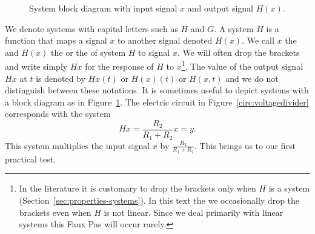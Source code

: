 \begin{figure}[tp]
\centering
{}
\caption{System block diagram with input signal $x$ and output signal $H(x)$.}\label{fig:blockdiagramH1}
\end{figure}



We denote systems with capital letters such as $H$ and $G$.  A system $H$ is a function that maps a signal $x$ to another signal denoted $H(x)$.  We call $x$ the  and $H(x)$ the  or the  of system $H$ to signal $x$.  We will often drop the brackets and write simply $Hx$ for the response of $H$ to $x$\footnote{In the literature it is customary to drop the brackets only when $H$ is a  system (Section~\ref{sec:properties-systems}).  In this text the we occasionally drop the brackets even when $H$ is not linear.  Since we deal primarily with linear systems this Faux Pas will occur rarely.}.  The value of the output signal $Hx$ at $t$ is denoted by $Hx(t)$ or $H(x)(t)$ or $H(x,t)$ and we do not distinguish between these notations.   %
It is sometimes useful to depict systems with a block diagram as in Figure~\ref{fig:blockdiagramH1}.  The electric circuit in Figure~\ref{circ:voltagedivider} corresponds with the system
\[
Hx = \frac{R_2}{R_1 + R_2} x = y.
\]
This system multiplies the input signal $x$ by $\frac{R_2}{R_1 + R_2}$.  This brings us to our first practical test.

